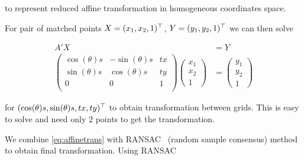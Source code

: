 to represent reduced affine transformation in homogeneous coordinates space.

For pair of matched points $X=(x_1,x_2,1)^\top$, $Y=(y_1, y_2, 1)^\top$ we can then solve

\begin{align}
    A'X &= Y \label{eq:affinetrans}\\
    \begin{pmatrix}
        \cos(\theta)s & -\sin(\theta)s & tx \\
        \sin(\theta)s & \cos(\theta)s & ty \\
        0 & 0 & 1 \\
    \end{pmatrix}
    \begin{pmatrix}
        x_1 \\
        x_2 \\
        1
    \end{pmatrix}
    &=
    \begin{pmatrix}
        y_1 \\
        y_2 \\
        1
    \end{pmatrix}
\end{align}

for $(\cos(\theta)s, \sin(\theta)s, tx, ty)^\top$ to obtain transformation between grids. This is easy to solve and need only $2$ points to get the transformation.

We combine \eqref{eq:affinetrans} with RANSAC~\cite{fischler1981random} (random sample consensus) method to obtain final transformation. Using RANSAC

